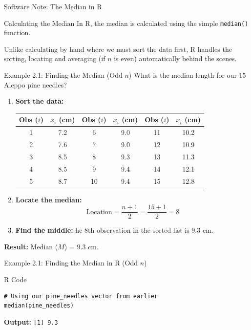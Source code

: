 \documentclass[aspectratio=169]{beamer}
\begin{document}
\begin{frame}[fragile]{Software Note: The Median in R}
\begin{block}{Calculating the Median}
In R, the median is calculated using the simple \texttt{median()} function.
\end{block}

\vspace{0.3cm}

Unlike calculating by hand where we must sort the data first, R handles the sorting, locating and averaging (if $n$ is even) automatically behind the scenes. 
\end{frame}

\begin{frame}{Example 2.1: Finding the Median (Odd $n$)}
What is the median length for our $15$ Aleppo pine needles?
\vspace{0.cm}
\begin{enumerate}
	\item \textbf{Sort the data:} \\
	\begin{table}
	\centering
	\scriptsize
		\begin{tabular}{cc|cc|cc}
		\toprule
		\textbf{Obs ($i$)} & \textbf{$x_i$ (cm)} & \textbf{Obs ($i$)} & \textbf{$x_i$ (cm)} & \textbf{Obs ($i$)} & \textbf{$x_i$ (cm)} \\
		\midrule
		1 & 7.2 & 6 & 9.0 & 11 & 10.2 \\
		2 & 7.6 & 7 & 9.0 & 12 & 10.9 \\
		3 & 8.5 & 8 & 9.3 & 13 & 11.3 \\
		4 & 8.5 & 9 & 9.4 & 14 & 12.1 \\
		5 & 8.7 & 10 & 9.4 & 15 & 12.8 \\
		\bottomrule
		\end{tabular}
	\end{table}
    \item \textbf{Locate the median:} \\
    $$ \text{Location} = \frac{n+1}{2} = \frac{15+1}{2} = 8 $$
    \item \textbf{Find the middle:} he 8th observation in the sorted list is 9.3 cm.
\end{enumerate}
 
\vspace{0.1cm}

\textbf{Result:} Median ($M$) = $9.3\text{ cm}$.
\end{frame}

\begin{frame}[fragile]{Example 2.1: Finding the Median in R (Odd $n$)}
\begin{block}{R Code}
\begin{verbatim}
# Using our pine_needles vector from earlier
median(pine_needles)
\end{verbatim}
\end{block}
\textbf{Output:}
\texttt{[1] 9.3}
\end{frame}
\end{document}
